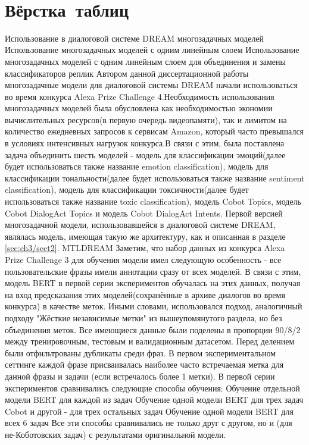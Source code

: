   \chapter{Вёрстка таблиц}\label{ch:ch3} 
  Использование в диалоговой системе DREAM многозадачных моделей
Использование многозадачных моделей с одним линейным слоем 
Использование многозадачных моделей с одним линейным слоем для объединения и замены классификаторов реплик
Автором данной диссертационной работы многозадачные модели для диалоговой системы DREAM начали использоваться во время конкурса Alexa Prize Challenge 4.Необходимость использования многозадачных моделей была обусловлена как необходимостью экономии вычислительных ресурсов(в первую очередь видеопамяти),
так и лимитом на количество ежедневных запросов к сервисам Amazon, который часто превышался в условиях интенсивных нагрузок конкурса.В связи с этим, была поставлена задача объединить шесть моделей - модель для классификации эмоций(далее будет использоваться также название emotion classification), модель для классификации тональности(далее будет использоваться также название sentiment classification), модель для классификации токсичности(далее будет использоваться также название toxic classification), модель Cobot Topics, модель Cobot DialogAct Topics и модель Cobot DialogAct Intents. 
Первой версией многозадачной модели, использовавшейся в диалоговой системе DREAM, являлась модель, имеющая такую же архитектуру,
как и описанная в разделе \ref{sec:ch3/sect2}. MTLDREAM
 Заметим, что набор данных из конкурса Alexa Prize Challenge 3 для обучения модели имел следующую особенность - все пользовательские фразы имели аннотации сразу от всех моделей. В связи с этим, модель BERT в первой серии экспериментов обучалась на этих данных, получая на вход предсказания этих моделей(сохранённые в архиве диалогов во время конкурса) в качестве меток. Иными словами, использовался подход, аналогичный подходу "Жёсткие независимые метки" из вышеупомянутого раздела, но без объединения меток. 
Все имеющиеся данные были поделены в пропорции 90/8/2 между тренировочным, тестовым и валидационным датасетом. Перед делением были отфильтрованы дубликаты среди фраз. В первом экспериментальном сеттинге каждой фразе присваивалась наиболее часто встречаемая метка для данной фразы и задачи (если встречалось более 1 метки). 
В первой серии экспериментов сравнивались следующие способы обучения:
Обучение отдельной модели BERT для каждой из задач
Обучение одной модели BERT для трех задач Cobot и другой - для трех остальных задач
Обучение одной модели BERT для всех 6 задач
Все эти способы сравнивались не только друг с другом, но и (для не-Коботовских задач) с результатами оригинальной модели. 

